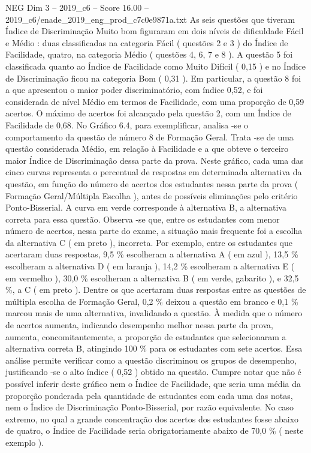 \begin{textsample}{NEG Dim 3 – 2019\_c6 – Score 16.00 – 2019\_c6/enade\_2019\_eng\_prod\_c7c0e9871a.txt}
As seis questões que tiveram Índice de Discriminação Muito bom figuraram em dois níveis de dificuldade Fácil e Médio : duas classificadas na categoria Fácil ( questões 2 e 3 ) do Índice de Facilidade, quatro, na categoria Médio ( questões 4, 6, 7 e 8 ).
A questão 5 foi classificada quanto ao Índice de Facilidade como Muito Difícil ( 0,15 ) e no Índice de Discriminação ficou na categoria Bom ( 0,31 ).
Em particular, a questão 8 foi a que apresentou o maior poder discriminatório, com índice 0,52, e foi considerada de nível Médio em termos de Facilidade, com uma proporção de 0,59 acertos.
O máximo de acertos foi alcançado pela questão 2, com um Índice de Facilidade de 0,68.
No Gráfico 6.4, para exemplificar, analisa -se o comportamento da questão de número 8 de Formação Geral.
Trata -se de uma questão considerada Médio, em relação à Facilidade e a que obteve o terceiro maior Índice de Discriminação dessa parte da prova.
Neste gráfico, cada uma das cinco curvas representa o percentual de respostas em determinada alternativa da questão, em função do número de acertos dos estudantes nessa parte da prova ( Formação Geral/Múltipla Escolha ), antes de possíveis eliminações pelo critério Ponto-Bisserial.
A curva em verde corresponde à alternativa B, a alternativa correta para essa questão.
Observa -se que, entre os estudantes com menor número de acertos, nessa parte do exame, a situação mais frequente foi a escolha da alternativa C ( em preto ), incorreta.
Por exemplo, entre os estudantes que acertaram duas respostas, 9,5 \% escolheram a alternativa A ( em azul ), 13,5 \% escolheram a alternativa D ( em laranja ), 14,2 \% escolheram a alternativa E ( em vermelho ), 30,0 \% escolheram a alternativa B ( em verde, gabarito ), e 32,5 \%, a C ( em preto ).
Dentre os que acertaram duas respostas entre as questões de múltipla escolha de Formação Geral, 0,2 \% deixou a questão em branco e 0,1 \% marcou mais de uma alternativa, invalidando a questão.
À medida que o número de acertos aumenta, indicando desempenho melhor nessa parte da prova, aumenta, concomitantemente, a proporção de estudantes que selecionaram a alternativa correta B, atingindo 100 \% para os estudantes com sete acertos.
Essa análise permite verificar como a questão discriminou os grupos de desempenho, justificando -se o alto índice ( 0,52 ) obtido na questão.
Cumpre notar que não é possível inferir deste gráfico nem o Índice de Facilidade, que seria uma média da proporção ponderada pela quantidade de estudantes com cada uma das notas, nem o Índice de Discriminação Ponto-Bisserial, por razão equivalente.
No caso extremo, no qual a grande concentração dos acertos dos estudantes fosse abaixo de quatro, o Índice de Facilidade seria obrigatoriamente abaixo de 70,0 \% ( neste exemplo ).

\end{textsample}
